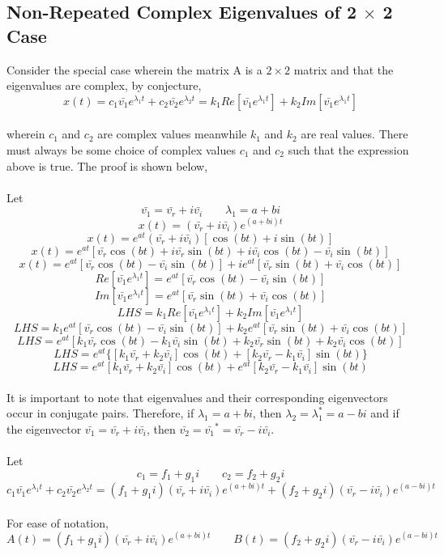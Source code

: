 \documentclass[a4paper, 12pt]{report}
\def\la{\lambda}
\def\b{\bar}
\begin{document}
\begin{center}
\subsection{Non-Repeated Complex Eigenvalues of 2 $\times$ 2 Case}
Consider the special case wherein the matrix A is a $2\times2$ matrix and that the eigenvalues are complex, by conjecture,
$$x(t) = c_1\b{v_1}e^{\la_1 t} + c_2\b{v_2}e^{\la_2 t} = k_1Re[\b{v_1}e^{\la_1 t}] + k_2Im[\b{v_1}e^{\la_1 t}]$$
\\wherein $c_1$ and $c_2$ are complex values meanwhile $k_1$ and $k_2$ are real values. There must always be some choice of complex values $c_1$ and $c_2$ such that the expression above is true. The proof is shown below,
\\~\\Let 
$$\b{v_1} = \b{v_r} + i\b{v_i}\qquad \la_1 = a + bi$$
$$x(t) = (\b{v_r} + i\b{v_i})e^{(a+bi)t}$$
$$x(t) = e^{at}(\b{v_r} + i\b{v_i})[\cos{(bt)} + i\sin{(bt)}]$$
$$x(t) = e^{at}[\b{v_r}\cos{(bt)} + i\b{v_r}\sin{(bt)} + i\b{v_i}\cos{(bt)} - \b{v_i}\sin{(bt)}]$$
$$x(t) = e^{at}[\b{v_r}\cos{(bt)} - \b{v_i}\sin{(bt)}]+ ie^{at}[\b{v_r}\sin{(bt)} + \b{v_i}\cos{(bt)}]$$
$$Re[\b{v_1}e^{\la_1 t}] = e^{at}[\b{v_r}\cos{(bt)} - \b{v_i}\sin{(bt)}]$$
$$Im[\b{v_1}e^{\la_1 t}] = e^{at}[\b{v_r}\sin{(bt)} + \b{v_i}\cos{(bt)}]$$
$$LHS = k_1Re[\b{v_1}e^{\la_1 t}] + k_2Im[\b{v_1}e^{\la_1 t}]$$
$$LHS = k_1e^{at}[\b{v_r}\cos{(bt)} - \b{v_i}\sin{(bt)}] + k_2e^{at}[\b{v_r}\sin{(bt)} + \b{v_i}\cos{(bt)}]$$
$$LHS = e^{at}[k_1\b{v_r}\cos{(bt)} - k_1\b{v_i}\sin{(bt)} + k_2\b{v_r}\sin{(bt)} + k_2\b{v_i}\cos{(bt)}]$$
$$LHS = e^{at}\{[k_1\b{v_r}+ k_2\b{v_i}]\cos{(bt)}  + [k_2\b{v_r}- k_1\b{v_i}]\sin{(bt)}\}$$
$$LHS = e^{at}[k_1\b{v_r}+ k_2\b{v_i}]\cos{(bt)}  + e^{at}[k_2\b{v_r}- k_1\b{v_i}]\sin{(bt)}$$
\\It is important to note that eigenvalues and their corresponding eigenvectors occur in conjugate pairs. Therefore, if $\la_1 = a+bi$, then $\la_2 = \la_1^\ast = a - bi$ and if the eigenvector $\b{v_1} = \b{v_r} + i\b{v_i}$, then $\b{v_2} =\b{v_1}^\ast= \b{v_r} - i\b{v_i}$.
\\~\\Let
$$c_1 = f_1 + g_1i\qquad c_2 = f_2 + g_2i$$
$$c_1\b{v_1}e^{\la_1 t} + c_2\b{v_2}e^{\la_2 t} = (f_1 + g_1i)(\b{v_r} + i\b{v_i})e^{(a+bi)t} + (f_2 + g_2i)(\b{v_r} - i\b{v_i})e^{(a-bi)t}$$
\\For ease of notation,
$$A(t) = (f_1 + g_1i)(\b{v_r} + i\b{v_i})e^{(a+bi)t}\qquad B(t) = (f_2 + g_2i)(\b{v_r} - i\b{v_i})e^{(a-bi)t}$$

\end{center}
\end{document}
